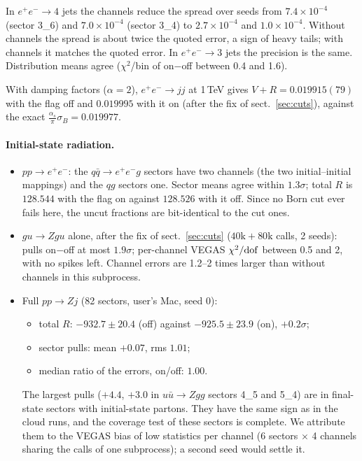 \documentclass[11pt,a4paper]{article}
\begin{document}
In $e^+e^-\to4$ jets the channels reduce the spread over seeds from
$7.4\times10^{-4}$ (sector 3\_6) and $7.0\times10^{-4}$ (sector 3\_4) to
$2.7\times10^{-4}$ and $1.0\times10^{-4}$. Without channels the spread is
about twice the quoted error, a sign of heavy tails; with channels it matches
the quoted error. In $e^+e^-\to3$ jets the precision is the same. Distribution
means agree ($\chi^2$/bin of on$-$off between 0.4 and 1.6).

With damping factors ($\alpha=2$), $e^+e^-\to jj$ at 1\,TeV gives
$V+R = 0.019915(79)$ with the flag off and $0.019995$ with it on (after the
fix of sect.~\ref{sec:cuts}), against the exact
$\frac{\alpha_s}{\pi}\sigma_B = 0.019977$.

\paragraph{Initial-state radiation.}
\begin{itemize}
\item $pp\to e^+e^-$: the $q\bar q\to e^+e^-g$ sectors have two channels (the
      two initial--initial mappings) and the $qg$ sectors one. Sector means
      agree within $1.3\sigma$; total $R$ is $128.544$ with the flag on against
      $128.526$ with it off. Since no Born cut ever fails here, the uncut
      fractions are bit-identical to the cut ones.
\item $gu\to Zgu$ alone, after the fix of sect.~\ref{sec:cuts}
      ($40\mathrm{k}+80\mathrm{k}$ calls, 2 seeds): pulls on$-$off at most
      $1.9\sigma$; per-channel VEGAS $\chi^2/{\rm dof}$ between 0.5 and 2, with
      no spikes left. Channel errors are 1.2--2 times larger than without
      channels in this subprocess.
\item Full $pp\to Zj$ (82 sectors, user's Mac, seed 0):
      \begin{itemize}
      \item total $R$: $-932.7\pm20.4$ (off) against $-925.5\pm23.9$ (on),
            $+0.2\sigma$;
      \item sector pulls: mean $+0.07$, rms $1.01$;
      \item median ratio of the errors, on/off: $1.00$.
      \end{itemize}
      The largest pulls ($+4.4$, $+3.0$ in $u\bar u\to Zgg$ sectors 4\_5 and
      5\_4) are in final-state sectors with initial-state partons. They have
      the same sign as in the cloud runs, and the coverage test of these
      sectors is complete. We attribute them to the VEGAS bias of low
      statistics per channel (6 sectors $\times$ 4 channels sharing the calls of
      one subprocess); a second seed would settle it.
\end{itemize}
\end{document}

